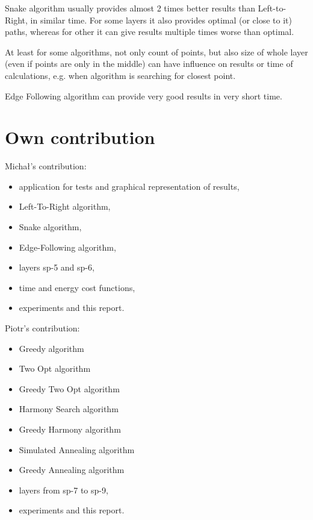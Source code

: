 \documentclass[titlepage]{article}
\begin{document}
Snake algorithm usually provides almost 2 times better results than Left-to-Right, in similar time. For some layers it also provides optimal (or close to it) paths, whereas for other it can give results multiple times worse than optimal.

At least for some algorithms, not only count of points, but also size of whole layer (even if points are only in the middle) can have influence on results or time of calculations, e.g. when algorithm is searching for closest point.

Edge Following algorithm can provide very good results in very short time.

\section{Own contribution}
Michał's contribution:
\begin{itemize}
\item application for tests and graphical representation of results,
\item Left-To-Right algorithm,
\item Snake algorithm,
\item Edge-Following algorithm,
\item layers sp-5 and sp-6,
\item time and energy cost functions,
\item experiments and this report.
\end{itemize}
Piotr's contribution:
\begin{itemize}
\item Greedy algorithm
\item Two Opt algorithm
\item Greedy Two Opt algorithm
\item Harmony Search algorithm
\item Greedy Harmony algorithm
\item Simulated Annealing algorithm
\item Greedy Annealing algorithm
\item layers from sp-7 to sp-9,
\item experiments and this report. 
\end{itemize}

\nocite{*}



\newpage


\end{document}
